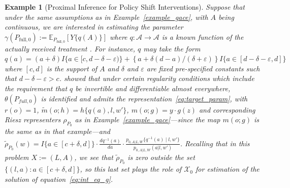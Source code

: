 \documentclass[twoside,11pt]{article}
\newtheorem{example}{Example}
\newcommand{\mc}{\mathcal}
\begin{document}
\begin{example}[Proximal Inference for Policy Shift Interventions]\label{example_mtp} Suppose that under the same assumptions as in Example~\ref{example_gace}, with $A$ being continuous, we are interested in estimating the parameter $\gamma(P_{\text{full},0}) := \mathbb{E}_{P_{\text{full},0}}\left[ Y\{q(A)\}\right]$ where $q:\mc{A} \rightarrow \mc{A}$ is a known function of the actually received treatment \citep{haneuse2013estimation, diaz2023nonparametric}. For instance, $q$ may take the form $q(a)=\left(a+\delta\right) I\{a\in[c,d-\delta-\varepsilon)\} +  \left\{a+\delta(d-a)/(\delta+\varepsilon)\right\} I\{a\in [d-\delta-\varepsilon, d]\}$ where  $[c,d]$ is the support of $A$ and $\delta$ and $\varepsilon$ are fixed pre-specified constants such that $d-\delta-\varepsilon >c$. \cite{olivas2025chap3} showed that under certain regularity conditions which include the requirement that $q$ be invertible and differentiable almost everywhere, $\theta(P_{full,0})$ is identified and admits the representation~\eqref{eq:target_param}, with
$ 
r(o) = 1$, $\tilde{m}(o;h) =h\{q(a),l,w'\}$, $m(o;g) = y \cdot g(z)$
and corresponding Riesz representers $\rho_{P_0}$ as in Example~\ref{example_gace}---since the map $m(o;g)$ is the same as in that example---and $\tilde\rho_{P_0}(w) = I\{a\in[c+\delta,d]\}\cdot\frac{dq^{-1}(a)}{da}\cdot\frac{p_{0,A|L,W}\{q^{-1}(a)\mid l,w'\}}{p_{0,A|L,W}(a|l,w')}$. Recalling that in this problem $X:=(L,A)$, we see that $\tilde\rho_{P_0}$ is zero outside the set $\{(l,a):a\in[c+\delta,d]\}$, so this last set plays the role of $\mc{X}_0$ for estimation of the solution of equation~\eqref{eq:int_eq_g}.
\end{example}
\end{document}
